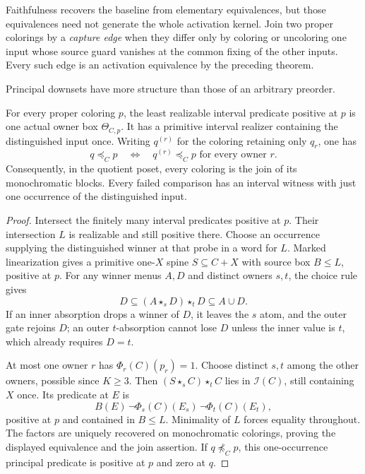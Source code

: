Faithfulness recovers the baseline from elementary equivalences, but
those equivalences need not generate the whole activation kernel.
Join two proper colorings by a \emph{capture edge} when they differ
only by coloring or uncoloring one input whose source guard vanishes
at the common fixing of the other inputs. Every such edge is an
activation equivalence by the preceding theorem.

Principal downsets have more structure than those of an arbitrary
preorder.

\begin{proposition}
\label{core:prop:principal-activation-boxes}
For every proper coloring $p$, the least realizable interval predicate
positive at $p$ is one actual owner box $\Theta_{C,p}$. It has a
primitive interval realizer containing the distinguished input once.
Writing $q^{(r)}$ for the coloring retaining only $q_r$, one has
\[
 q\preceq_C p\quad\Longleftrightarrow\quad
 q^{(r)}\preceq_C p\text{ for every owner }r.
\]
Consequently, in the quotient poset, every coloring is the join of its
monochromatic blocks. Every failed comparison has an interval witness
with just one occurrence of the distinguished input.
\end{proposition}
\begin{proof}
Intersect the finitely many interval predicates positive at $p$.
Their intersection $L$ is realizable and still positive there.
Choose an occurrence supplying the distinguished winner at that probe
in a word for $L$. Marked linearization gives a primitive one-$X$
spine $S\subseteq C+X$ with source box $B\leq L$, positive at $p$.
For any winner menus $A,D$ and distinct owners $s,t$, the choice rule gives
\begin{equation}\label{core:eq:two-owner-restoration}
 D\subseteq (A\star_s D)\star_t D\subseteq A\cup D.
\end{equation}
If an inner absorption drops a winner of $D$, it leaves the $s$ atom,
and the outer gate rejoins $D$; an outer $t$-absorption cannot lose
$D$ unless the inner value is $t$, which already requires $D=t$.

At most one owner $r$ has $\Phi_r(C)(p_r)=1$. Choose distinct
$s,t$ among the other owners, possible since $K\geq3$.
Then $(S\star_s C)\star_t C$ lies in $\mathcal I(C)$, still
containing $X$ once. Its predicate at $E$ is
\[
 B(E)\,\neg\Phi_s(C)(E_s)\,\neg\Phi_t(C)(E_t),
\]
positive at $p$ and contained in $B\leq L$.
Minimality of $L$ forces equality throughout.
The factors are uniquely recovered
on monochromatic colorings, proving the displayed equivalence and
the join assertion. If $q\not\preceq_Cp$, this one-occurrence
principal predicate is positive at $p$ and zero at $q$.
\end{proof}

